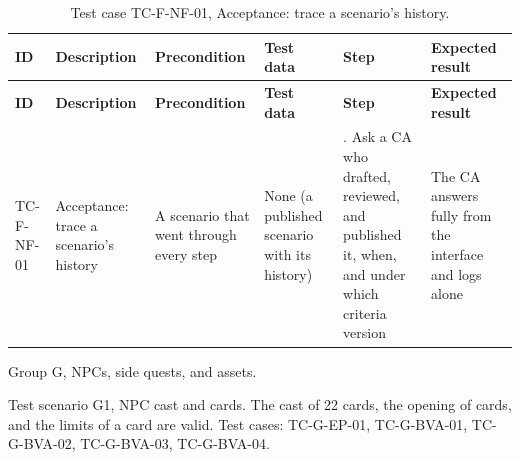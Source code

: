 {\footnotesize{}\renewcommand{\arraystretch}{1.1}
\begin{longtable}{|>{\raggedright\arraybackslash}p{}|>{\raggedright\arraybackslash}p{}|>{\raggedright\arraybackslash}p{}|>{\raggedright\arraybackslash}p{}|>{\raggedright\arraybackslash}p{}|>{\raggedright\arraybackslash}p{}|}
\caption{Test case TC-F-NF-01, Acceptance: trace a scenario's history.} \\
\hline
\textbf{ID} & \textbf{Description} & \textbf{Precondition} & \textbf{Test data} & \textbf{Step} & \textbf{Expected result} \\ \hline
\endfirsthead
\hline
\textbf{ID} & \textbf{Description} & \textbf{Precondition} & \textbf{Test data} & \textbf{Step} & \textbf{Expected result} \\ \hline
\endhead
TC-F-NF-01 & Acceptance: trace a scenario's history & A scenario that went through every step & None (a published scenario with its history) & 1. Ask a CA who drafted, reviewed, and published it, when, and under which criteria version & The CA answers fully from the interface and logs alone \\ \hline
\end{longtable}
}

Group G, NPCs, side quests, and assets.

Test scenario G1, NPC cast and cards. The cast of 22 cards, the opening of cards, and the limits of a card are valid. Test cases: TC-G-EP-01, TC-\allowbreak{}G-\allowbreak{}BVA-\allowbreak{}01, TC-\allowbreak{}G-\allowbreak{}BVA-\allowbreak{}02, TC-\allowbreak{}G-\allowbreak{}BVA-\allowbreak{}03, TC-\allowbreak{}G-\allowbreak{}BVA-\allowbreak{}04.

